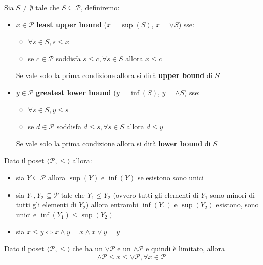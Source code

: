 \begin{definizione}
    Sia $S\ne \emptyset$ tale che $S\subseteq \mathcal{P}$, definiremo:
    \begin{itemize}
        \item $x\in \mathcal{P}$ \textbf{least upper bound} ($x=\sup(S)$, $x=\lor S$) sse:
        \begin{itemize}
            \item $\forall s\in S, s\le x$
            \item se $c\in \mathcal{P}$ soddisfa $s\le c,\forall s\in S$ allora $x\le c$
        \end{itemize}
        Se vale solo la prima condizione allora si dirà \textbf{upper bound} di $S$
        \item $y\in \mathcal{P}$ \textbf{greatest lower bound} ($y=\inf(S)$, $y=\land S$) sse:
        \begin{itemize}
            \item $\forall s\in S, y\le s$
            \item se $d\in \mathcal{P}$ soddisfa $d\le s,\forall s\in S$ allora $d\le y$
        \end{itemize}
        Se vale solo la prima condizione allora si dirà \textbf{lower bound} di $S$
    \end{itemize}
\end{definizione}

\begin{osservazione}
    Dato il poset $\langle \mathcal{P},\le\rangle$ allora:
    \begin{itemize}
        \item sia $Y\subseteq\mathcal{P}$ allora $\sup (Y)$ e $\inf (Y)$ se esistono
        sono unici
        \item sia $Y_1,Y_2\subseteq\mathcal{P}$ tale che $Y_1\le Y_2$ (ovvero tutti 
        gli elementi di $Y_1$ sono minori di tutti gli elementi di $Y_2$) allora entrambi
        $\inf(Y_1)$ e $\sup (Y_2)$ esistono, sono unici e $\inf(Y_1)\le \sup(Y_2)$
        \item sia $x\le y\iff x\land y = x \land x\lor y=y$ 
    \end{itemize}
\end{osservazione}

\begin{nota}
    Dato il poset $\langle \mathcal{P},\le\rangle$ che ha un $\lor \mathcal{P}$ e 
    un $\land\mathcal{P}$ e quindi è limitato, allora 
    $$\land\mathcal{P}\le x\le \lor \mathcal{P}, \forall x\in \mathcal{P}$$ 
\end{nota}


